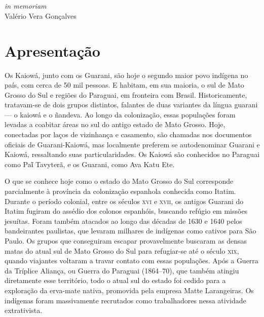 \chapter*{}
\thispagestyle{empty}

\vfill
\begin{flushright}
\small
\textit{in memoriam}\\
Valério Vera Gonçalves
\end{flushright}

\chapter{Apresentação}

Os Kaiowá, junto com os Guarani, são hoje o segundo maior povo indígena
no país, com cerca de 50 mil pessoas. E habitam, em sua maioria, o sul
de Mato Grosso do Sul e regiões do Paraguai, em fronteira com Brasil.
Historicamente, tratavam-se de dois grupos distintos, falantes de duas
variantes da língua guarani --- o kaiowá e o ñandeva. Ao longo da
colonização, essas populações foram levadas a coabitar áreas no
sul do antigo estado de Mato Grosso. Hoje, conectadas por laços de
vizinhança e casamento, são chamadas nos documentos oficiais de
Guarani-Kaiowá, mas localmente preferem se autodenominar Guarani e
Kaiowá, ressaltando suas particularidades. Os Kaiowá são conhecidos no
Paraguai como Paῖ Tavyterã, e os Guarani, como Ava Katu Ete.

O que se conhece hoje como o estado do Mato Grosso do Sul corresponde
parcialmente à província da colonização espanhola conhecida como Itatim.
Durante o período colonial, entre os séculos \textsc{xvi} e \textsc{xvii}, os antigos
Guarani do Itatim fugiram do assédio dos colonos espanhóis, buscando
refúgio em missões jesuítas. Foram também atacados ao longo das décadas
de 1630 e 1640 pelos bandeirantes paulistas, que levaram milhares de indígenas como cativos para São Paulo. Os grupos que conseguiram escapar
provavelmente buscaram as densas matas do atual sul de Mato Grosso do
Sul para refugiar-se até o século \textsc{xix}, quando viajantes voltaram a
travar contato com essas populações. Após a Guerra da Tríplice Aliança,
ou Guerra do Paraguai (1864--70), que também atingiu diretamente esse
território, todo o atual sul do estado foi cedido para a exploração da
erva-mate nativa, promovida pela empresa Matte Larangeiras. Os indígenas
foram massivamente recrutados como trabalhadores nessa atividade
extrativista.

